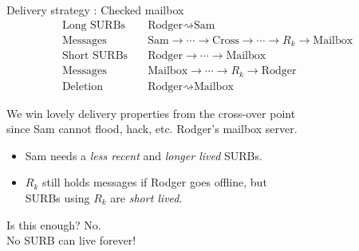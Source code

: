 \documentclass[fleqn,xcolor={usenames,dvipsnames}]{beamer}
\begin{document}
\begin{frame}[t]{Delivery strategy : Checked mailbox}
\[ \begin{aligned}
\textrm{Long SURBs}\quad & \textrm{Rodger} \rightsquigarrow \textrm{Sam} \\
\textrm{Messages}\quad & \textrm{Sam} \to \cdots \to \textrm{Cross}
  \to \cdots \to R_k \to \textrm{Mailbox} \\
\textrm{Short SURBs}\quad & \textrm{Rodger} \to \cdots \to \textrm{Mailbox} \\
\textrm{Messages}\quad & \textrm{Mailbox} \to \cdots \to R_k \to \textrm{Rodger} \\
\textrm{Deletion}\quad & \textrm{Rodger} \rightsquigarrow \textrm{Mailbox} 
\end{aligned} \]

\smallskip

We win lovely delivery properties from the cross-over point \\
 \hspace*{2pt} since Sam cannot flood, hack, etc. Rodger's mailbox server.

\smallskip

\begin{itemize}
\item Sam needs a {\em less recent} and {\em longer lived} SURBs. %
\item $R_k$ still holds messages if Rodger goes offline, but \\
 \hspace*{2pt} SURBs using $R_k$ are {\em short lived}. %
\end{itemize}


\medskip
Is this enough?  No.  \\
 \hspace*{2pt} No SURB can live forever!

\end{frame}
\end{document}
